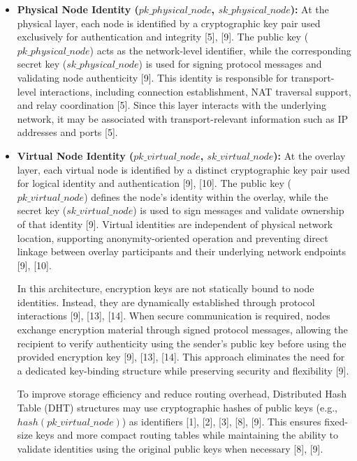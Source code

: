 \documentclass[12pt,a4paper]{article}
\begin{document}
\begin{itemize}

\item \textbf{Physical Node Identity ($pk\_physical\_node$, $sk\_physical\_node$):}  
At the physical layer, each node is identified by a cryptographic key pair used exclusively for authentication and integrity [5], [9]. The public key ($pk\_physical\_node$) acts as the network-level identifier, while the corresponding secret key ($sk\_physical\_node$) is used for signing protocol messages and validating node authenticity [9]. This identity is responsible for transport-level interactions, including connection establishment, NAT traversal support, and relay coordination [5]. Since this layer interacts with the underlying network, it may be associated with transport-relevant information such as IP addresses and ports [5].

\item \textbf{Virtual Node Identity ($pk\_virtual\_node$, $sk\_virtual\_node$):}  
At the overlay layer, each virtual node is identified by a distinct cryptographic key pair used for logical identity and authentication [9], [10]. The public key ($pk\_virtual\_node$) defines the node's identity within the overlay, while the secret key ($sk\_virtual\_node$) is used to sign messages and validate ownership of that identity [9]. Virtual identities are independent of physical network location, supporting anonymity-oriented operation and preventing direct linkage between overlay participants and their underlying network endpoints [9], [10].

In this architecture, encryption keys are not statically bound to node identities. Instead, they are dynamically established through protocol interactions [9], [13], [14]. When secure communication is required, nodes exchange encryption material through signed protocol messages, allowing the recipient to verify authenticity using the sender's public key before using the provided encryption key [9], [13], [14]. This approach eliminates the need for a dedicated key-binding structure while preserving security and flexibility [9].

To improve storage efficiency and reduce routing overhead, Distributed Hash Table (DHT) structures may use cryptographic hashes of public keys (e.g., $hash(pk\_virtual\_node)$) as identifiers [1], [2], [3], [8], [9]. This ensures fixed-size keys and more compact routing tables while maintaining the ability to validate identities using the original public keys when necessary [8], [9].

\end{itemize}
\end{document}
